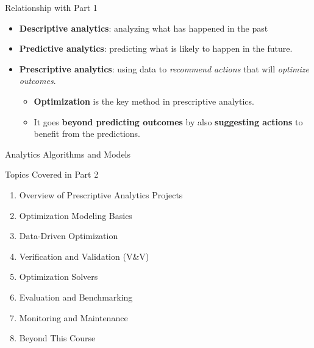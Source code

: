 \documentclass [xcolor=svgnames, handout]{beamer}
\begin{document}
\begin{frame}{Relationship with Part 1}
    \begin{itemize}[<+->]
        \item \textbf{Descriptive analytics}: analyzing what has happened in the past
        \item \textbf{Predictive analytics}: predicting what is likely to happen in the future.
        \item \textbf{Prescriptive analytics}: using data to \emph{recommend actions} that will \emph{optimize outcomes}.
        \begin{itemize}[<.->]
            \item \textbf{Optimization} is the key method in prescriptive analytics.
            \item It goes \textbf{beyond predicting outcomes} by also \textbf{suggesting actions} to benefit from the predictions.
        \end{itemize}
    \end{itemize}
\end{frame}


\begin{frame}{Analytics Algorithms and Models}
    \begin{figure}
        \centering
                
    \end{figure}    
\end{frame}


\begin{frame}{Topics Covered in Part 2}
    \begin{enumerate}[<+->]
        \item Overview of Prescriptive Analytics Projects
        \item Optimization Modeling Basics
        \item Data-Driven Optimization
        \item Verification and Validation (V\&V)
        \item Optimization Solvers
        \item Evaluation and Benchmarking
        \item Monitoring and Maintenance
        \item Beyond This Course
    \end{enumerate}    
\end{frame}
\end{document}
